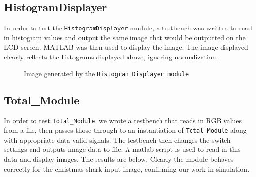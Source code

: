\documentclass[12pt]{article}
\begin{document}
  \subsection{HistogramDisplayer}
  In order to test the \texttt{HistogramDisplayer} module, a testbench was written to read in histogram values and output the same image that would be outputted on the LCD screen. MATLAB was then used to display the image. The image displayed clearly reflects the histograms displayed above, ignoring normalization.
  \begin{figure}[H]
    \caption{Image generated by the \texttt{Histogram Displayer module}}
    \label{fig:histogram_displayer_testbench}
  \end{figure} 
  
  \newpage
  \subsection{Total\_Module}
  In order to test \texttt{Total\_Module}, we wrote a testbench that reads in RGB values from a file, then passes those through to an instantiation of \texttt{Total\_Module} along with appropriate data valid signals. The testbench then changes the switch settings and outputs image data to file. A matlab script is used to read in this data and display images. The results are below. Clearly the module behaves correctly for the christmas shark input image, confirming our work in simulation.
\end{document}
